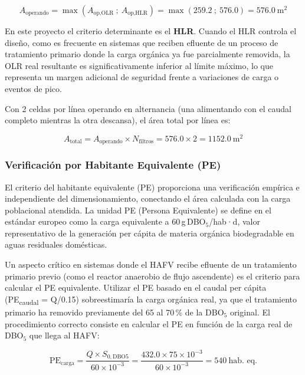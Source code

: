 \begin{equation}
A_\text{operando} = \max\!\left(A_\text{op,OLR}\ ;\ A_\text{op,HLR}\right) = \max\!\left(259.2\ ;\ 576.0\right) = 576.0\ \text{m}^2
\end{equation}

En este proyecto el criterio determinante es el \textbf{HLR}. Cuando el HLR controla el diseño, como es frecuente en sistemas que reciben efluente de un proceso de tratamiento primario donde la carga orgánica ya fue parcialmente removida, la OLR real resultante es significativamente inferior al límite máximo, lo que representa un margen adicional de seguridad frente a variaciones de carga o eventos de pico.

Con 2 celdas por línea operando en alternancia (una alimentando con el caudal completo mientras la otra descansa), el área total por línea es:

\begin{equation}
A_\text{total} = A_\text{operando} \times N_\text{filtros} = 576.0 \times 2 = 1152.0\ \text{m}^2
\end{equation}

\subsubsection*{Verificación por Habitante Equivalente (PE)}

El criterio del habitante equivalente (PE) proporciona una verificación empírica e independiente del dimensionamiento, conectando el área calculada con la carga poblacional atendida. La unidad PE (Persona Equivalente) se define en el estándar europeo como la carga equivalente a 60\,g\,DBO$_5$/hab·d, valor representativo de la generación per cápita de materia orgánica biodegradable en aguas residuales domésticas.

Un aspecto crítico en sistemas donde el HAFV recibe efluente de un tratamiento primario previo (como el reactor anaerobio de flujo ascendente) es el criterio para calcular el PE equivalente. Utilizar el PE basado en el caudal per cápita (PE\textsubscript{caudal} = Q/0.15) sobreestimaría la carga orgánica real, ya que el tratamiento primario ha removido previamente del 65 al 70\,\% de la DBO$_5$ original. El procedimiento correcto consiste en calcular el PE en función de la carga real de DBO$_5$ que llega al HAFV:

\begin{equation}
\text{PE}_\text{carga} = \frac{Q \times S_{0,\text{DBO5}}}{60 \times 10^{-3}} = \frac{432.0 \times 75 \times 10^{-3}}{60 \times 10^{-3}} = 540\ \text{hab. eq.}
\end{equation}


